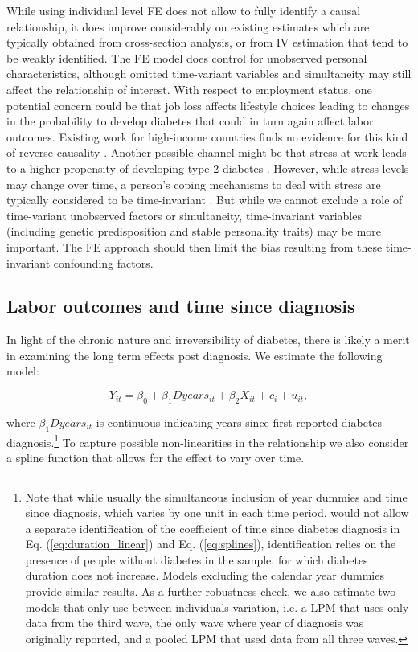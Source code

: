 \documentclass[12pt,english]{article}
\begin{document}
While using individual level \ac{FE} does not allow to fully identify a causal relationship, it does improve considerably on existing estimates which are typically obtained from cross-section analysis, or from \ac{IV} estimation that tend to be weakly identified.  The FE model does control for unobserved personal characteristics, although omitted time-variant variables and simultaneity may still affect the relationship of interest. With respect to employment status, one potential concern could be that job loss affects lifestyle choices leading to changes in the probability to develop diabetes that could in turn again affect labor outcomes. Existing work for high-income countries finds no evidence for  this kind of reverse causality \parencite{Bergemann2011,Schaller2015}. Another possible channel might be that stress at work leads to a higher propensity of developing type 2 diabetes \parencite{Heraclides2012,Eriksson2013}. However, while stress levels may change over time, a person’s coping mechanisms to deal with stress are typically considered to be time-invariant \parencite{Schneiderman2005}. But while we cannot exclude a role of time-variant unobserved factors or simultaneity, time-invariant variables (including genetic predisposition and stable personality traits) may be more important. The \ac{FE} approach should then limit the bias resulting from these time-invariant confounding factors.


\subsection{Labor outcomes and time since diagnosis}

In light of the chronic nature and irreversibility of diabetes, there is likely a merit in examining the long term effects post diagnosis.  We estimate the following model:

\begin{equation}
Y_{it}=\beta_{0}+\beta_{1}Dyears_{it}+\beta_{2}X_{it}+c_{i}+u_{it},\label{eq:duration_linear}
\end{equation}

\noindent where $\beta_{1}Dyears_{it}$ is continuous indicating years since first reported diabetes diagnosis.\footnote{Note that while usually the simultaneous inclusion of year dummies and time since diagnosis, which varies by one unit in each time period, would not allow a separate identification of the coefficient of time since diabetes diagnosis in Eq.  (\ref{eq:duration_linear}) and Eq.  (\ref{eq:splines}), identification relies on the presence of people without diabetes in the sample, for which diabetes duration does not increase.  Models excluding the calendar year dummies provide similar results.  As a further robustness check, we also estimate two models that only use between-individuals variation, i.e. a \ac{LPM} that uses only data from the third wave, the only wave where year of diagnosis was originally reported, and a pooled \ac{LPM} that used data from all three waves.} To capture possible non-linearities in the relationship we also consider a spline function that allows for the effect to vary over time.
\end{document}
